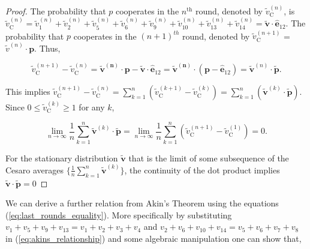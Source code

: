 \documentclass{article}
\theoremstyle{definition}
\begin{document}
\begin{proof}
  The probability that \(p\) cooperates in the \(n^{\text{th}}\) round, denoted
  by \(\tilde{v}_{\text{C}}^{(n)}\), is \(\tilde{v}_{\text{C}}^{(n)} = \tilde{v}_{1}^{(n)} +
  \tilde{v}_{2}^{(n)} + \tilde{v}_{5}^{(n)} + \tilde{v}_{6}^{(n)} + \tilde{v}_{9}^{(n)} +  \tilde{v}_{10}^{(n)} +
  \tilde{v}_{13}^{(n)} + \tilde{v}_{14}^{(n)} = \mathbf{\tilde{v}} \cdot \mathbf{\hat{e}}_{1 2}\). The probability that \(p\) cooperates in the
  \((n + 1)^{th}\) round, denoted by \(\tilde{v}_{\text{C}}^{(n + 1)}\) = \(\tilde{v}^{(n)} \cdot \mathbf{p}\).
  Thus,

  \begin{equation*}
   \tilde{v}_{\text{C}}^{(n + 1)} - \tilde{v}_{\text{C}}^{(n)} = \mathbf{\tilde{v}^{(n)}} \cdot \mathbf{p} - \mathbf{\tilde{v}} \cdot \mathbf{\hat{e}}_{1 2}
    = \mathbf{\tilde{v}^{(n)}} \cdot (\mathbf{p} - \mathbf{\hat{e}}_{1 2}) = \mathbf{\tilde{v}}^{(n)} \cdot \mathbf{\tilde{p}}.
  \end{equation*}

  This implies \(\tilde{v}_{\text{C}}^{(n + 1)} - \tilde{v}_{\text{C}}^{(n)}
  = \sum_{k=1}^{n} (\tilde{v}_{\text{C}}^{(k + 1)} - \tilde{v}_{\text{C}}^{(k)})
  = \sum_{k=1}^{n} (\mathbf{\tilde{v}}^{(k)} \cdot \mathbf{\tilde{p}})\). Since
  \(0 \leq \tilde{v}_{\text{C}}^{(k)} \geq 1\) for any \(k\),

  \begin{equation}\label{eq:akins_relationship}
    \lim_{n \rightarrow \infty} \frac{1}{n} \sum_{k=1}^{n} \mathbf{\tilde{v}}^{(k)} \cdot \mathbf{\tilde{p}} = 
    \lim_{n \rightarrow \infty} \frac{1}{n} \sum_{k=1}^{n} (\tilde{v}_{\text{C}}^{(n + 1)} - \tilde{v}_{\text{C}}^{(1)}) = 0.
  \end{equation}

  For the stationary distribution \(\mathbf{\tilde{v}}\) that is the limit of
  some subsequence of the Cesaro averages \(\{\frac{1}{n} \sum_{k=1}^{n} \mathbf{\tilde{v}}^{(k)}\}\),
  the continuity of the dot product implies \(\mathbf{\tilde{v}} \cdot \mathbf{\tilde{p}} = 0 \)

\end{proof}

We can derive a further relation from Akin's Theorem using the equations
(\ref{eq:last_rounds_equality}). More specifically by substituting \(v_{1} +
v_{5} + v_{9} + v_{13} = v_{1} +
v_{2} + v_{3} + v_{4} \) and \(v_{2} + v_{6} + v_{10} + v_{14} =
v_{5} + v_{6} + v_{7} + v_{8} \) in (\ref{eq:akins_relationship}) and some
algebraic manipulation one can show that,
\end{document}
